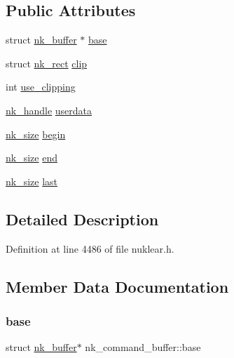 \subsection*{Public Attributes}
\begin{DoxyCompactItemize}
\item 
struct \mbox{\hyperlink{structnk__buffer}{nk\+\_\+buffer}} $\ast$ \mbox{\hyperlink{structnk__command__buffer_a2f4ee111972e35eb24365a245f858006}{base}}
\item 
struct \mbox{\hyperlink{structnk__rect}{nk\+\_\+rect}} \mbox{\hyperlink{structnk__command__buffer_a65da2f77d2ce8eb0a6ac6a0861e39382}{clip}}
\item 
int \mbox{\hyperlink{structnk__command__buffer_a65f789788b8a857efa0c4080781591f7}{use\+\_\+clipping}}
\item 
\mbox{\hyperlink{unionnk__handle}{nk\+\_\+handle}} \mbox{\hyperlink{structnk__command__buffer_adc12ff0f2c3965f2df8da6d83c5b9903}{userdata}}
\item 
\mbox{\hyperlink{nuklear_8h_a84c0fc50dec5501be327b33d41d9010c}{nk\+\_\+size}} \mbox{\hyperlink{structnk__command__buffer_a7c3c96052c6c8461ea78e7c4c6ed8ab2}{begin}}
\item 
\mbox{\hyperlink{nuklear_8h_a84c0fc50dec5501be327b33d41d9010c}{nk\+\_\+size}} \mbox{\hyperlink{structnk__command__buffer_a12fd620faceb994143967021e44a8b71}{end}}
\item 
\mbox{\hyperlink{nuklear_8h_a84c0fc50dec5501be327b33d41d9010c}{nk\+\_\+size}} \mbox{\hyperlink{structnk__command__buffer_a6334ab37cb3c65736585a30fc3e19c01}{last}}
\end{DoxyCompactItemize}


\subsection{Detailed Description}


Definition at line 4486 of file nuklear.\+h.



\subsection{Member Data Documentation}
\mbox{\label{structnk__command__buffer_a2f4ee111972e35eb24365a245f858006}} 
\subsubsection{\texorpdfstring{base}{base}}
{\footnotesize\ttfamily struct \mbox{\hyperlink{structnk__buffer}{nk\+\_\+buffer}}$\ast$ nk\+\_\+command\+\_\+buffer\+::base}




